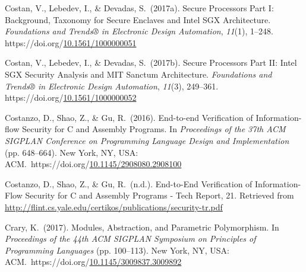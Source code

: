 \documentclass[12pt,twoside]{article}
\begin{document}
{\begin{thebibliography}{222}
Costan, V., Lebedev, I., \& Devadas, S.~(2017a). Secure Processors Part I: Background, Taxonomy for Secure Enclaves and Intel SGX Architecture. \emph{Foundations and Trends® in Electronic Design Automation}, \emph{11}(1), 1–248. https://doi.org/\href{https://dx.doi.org/10.1561/1000000051}{10.1561/1000000051}\label{costan_secure_2017}%

Costan, V., Lebedev, I., \& Devadas, S.~(2017b). Secure Processors Part II: Intel SGX Security Analysis and MIT Sanctum Architecture. \emph{Foundations and Trends® in Electronic Design Automation}, \emph{11}(3), 249–361. https://doi.org/\href{https://dx.doi.org/10.1561/1000000052}{10.1561/1000000052}\label{costan_secure_2017-1}%

Costanzo, D., Shao, Z., \& Gu, R.~(2016). End-to-end Verification of Information-flow Security for C and Assembly Programs. In \emph{Proceedings of the 37th ACM SIGPLAN Conference on Programming Language Design and Implementation} (pp. 648–664). New York, NY, USA: ACM.~https://doi.org/\href{https://dx.doi.org/10.1145/2908080.2908100}{10.1145/2908080.2908100}\label{costanzo_end--end_2016}%

Costanzo, D., Shao, Z., \& Gu, R.~(n.d.). End-to-End Veriﬁcation of Information-Flow Security for C and Assembly Programs - Tech Report, 21. Retrieved from \href{http://flint.cs.yale.edu/certikos/publications/security-tr.pdf}{{\ttfamily http://\hspace{0pt}flint.\hspace{0pt}cs.\hspace{0pt}yale.\hspace{0pt}edu/\hspace{0pt}certikos/\hspace{0pt}publications/\hspace{0pt}security-\hspace{0pt}tr.\hspace{0pt}pdf}}\label{costanzo_end--end_nodate}%

\mdbibitemlabel{[Crary, 2017]}Crary, K.~(2017). Modules, Abstraction, and Parametric Polymorphism. In \emph{Proceedings of the 44th ACM SIGPLAN Symposium on Principles of Programming Languages} (pp. 100–113). New York, NY, USA: ACM.~https://doi.org/\href{https://dx.doi.org/10.1145/3009837.3009892}{10.1145/3009837.3009892}\label{crary_modules_2017}%


\end{thebibliography}}
\end{document}
